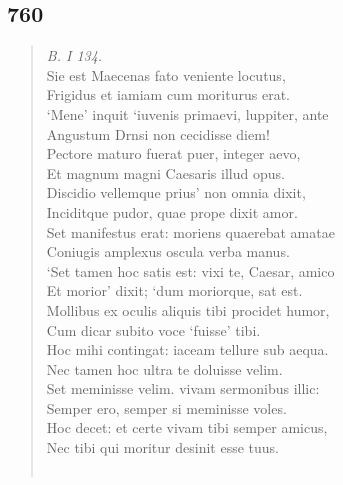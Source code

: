 \documentclass[11pt, a4paper]{report}
\begin{document}
            \subsection*{760}
      \begin{verse}
      \textit{B. I 134.} \\ Sie est Maecenas fato veniente locutus, \\ Frigidus et iamiam cum moriturus erat. \\ ‘Mene’ inquit ‘iuvenis primaevi, luppiter, ante \\ Angustum Drnsi non cecidisse diem! \\ Pectore maturo fuerat puer, integer aevo, \\ Et magnum magni Caesaris illud opus. \\ Discidio vellemque prius’ non omnia dixit, \\ Inciditque pudor, quae prope dixit amor. \\ Set manifestus erat: moriens quaerebat amatae \\ Coniugis amplexus oscula verba manus. \\ ‘Set tamen hoc satis est: vixi te, Caesar, amico \\ Et morior’ dixit; ‘dum moriorque, sat est. \\ Mollibus ex oculis aliquis tibi procidet humor, \\ Cum dicar subito voce ‘fuisse’ tibi. \\ Hoc mihi contingat: iaceam tellure sub aequa. \\ Nec tamen hoc ultra te doluisse velim. \\ Set meminisse velim. vivam sermonibus illic: \\ Semper ero, semper si meminisse voles. \\ Hoc decet: et certe vivam tibi semper amicus, \\ Nec tibi qui moritur desinit esse tuus. \\ 
        ﻿\pagebreak 

\end{verse}
\end{document}
